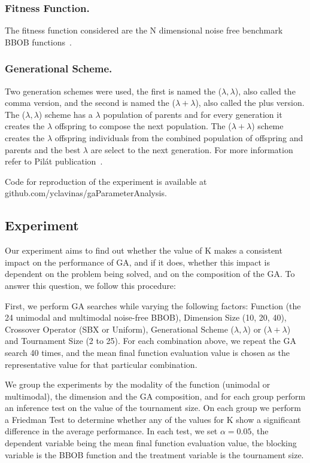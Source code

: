 \subsubsection*{Fitness Function.}
The fitness function considered are the N dimensional noise free
benchmark BBOB functions~\cite{hansen2010real}.

\subsubsection*{Generational Scheme.}
Two generation schemes were used, the first is named the ($\lambda,
\lambda$), also called the comma version, and the second is named the
($\lambda + \lambda$), also called the plus version. The ($\lambda,
\lambda$) scheme has a $\lambda$ population of parents and for every
generation it creates the $\lambda$ offspring to compose the next
population. The ($\lambda + \lambda$) scheme creates the $\lambda$
offspring individuals from the combined population
of offspring and parents and the best $\lambda$ are select to the next
generation. For more information refer to Pil{\'a}t publication~\cite{pilat2017parallel}.

Code for reproduction of the experiment is available at github.com/yclavinas/gaParameterAnalysis.

\subsection{Experiment}\label{sec:experiment}

Our experiment aims to find out whether the value of K makes a
consistent impact on the performance of GA, and if it does, whether
this impact is dependent on the problem being solved, and on the
composition of the GA. To answer this question, we follow this procedure:

First, we perform GA searches while varying the following factors:
Function (the 24 unimodal and multimodal noise-free BBOB), Dimension
Size (10, 20, 40), Crossover Operator (SBX or Uniform), Generational
Scheme ($\lambda, \lambda$) or ($\lambda + \lambda$) and Tournament
Size (2 to 25). For each combination above, we repeat the GA search 40
times, and the mean final function evaluation value is chosen as the
representative value for that particular combination.

We group the experiments by the modality of the function (unimodal or
multimodal), the dimension and the GA composition, and for each group
perform an inference test on the value of the tournament size. On each
group we perform a Friedman Test to determine whether any of the
values for K show a significant difference in the average
performance. In each test, we set $\alpha = 0.05$, the dependent
variable being the mean final function evaluation value, the blocking
variable is the BBOB function and the treatment variable is the
tournament size.





